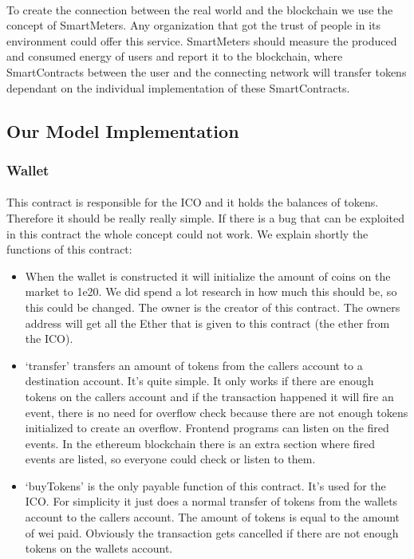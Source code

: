 \documentclass{scrartcl}
\begin{document}
	\paragraph{}
	To create the connection between the real world and the blockchain we use the concept of SmartMeters. Any organization that got the trust of people in its environment could offer this service. SmartMeters should measure the produced and consumed energy of users and report it to the blockchain, where SmartContracts between the user and the connecting network will transfer tokens dependant on the individual implementation of these SmartContracts.
	
	\subsection{Our Model Implementation}
	
	\subsubsection{Wallet}
	
	\paragraph{}
	This contract is responsible for the ICO and it holds the balances of tokens. Therefore it should be really really simple. If there is a bug that can be exploited in this contract the whole concept could not work. We explain shortly the functions of this contract:
	
	\begin{itemize}
		\item When the wallet is constructed it will initialize the amount of coins on the market to 1e20. We did spend a lot research in how much this should be, so this could be changed. The owner is the creator of this contract. The owners address will get all the Ether that is given to this contract (the ether from the ICO).
		\item ‘transfer’ transfers an amount of tokens from the callers account to a destination account. It’s quite simple. It only works if there are enough tokens on the callers account and if the transaction happened it will fire an event, there is no need for overflow check because there are not enough tokens initialized to create an overflow. Frontend programs can listen on the fired events. In the ethereum blockchain there is an extra section where fired events are listed, so everyone could check or listen to them.
		\item ‘buyTokens’ is the only payable function of this contract. It’s used for the ICO. For simplicity it just does a normal transfer of tokens from the wallets account to the callers account. The amount of tokens is equal to the amount of wei paid. Obviously the transaction gets cancelled if there are not enough tokens on the wallets account.
	\end{itemize}
		
\end{document}
